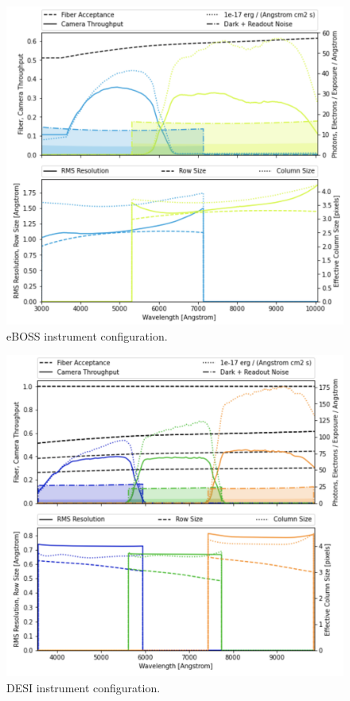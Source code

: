 \begin{figure}[h]
\centering
\includegraphics[width=12cm]{images/specsim/eboss_config.png}
\caption{eBOSS instrument configuration.}
\label{fig:eboss_config}
\end{figure}

\begin{figure}[h]
\centering
\includegraphics[width=12cm]{images/specsim/desi_config.png}
\caption{DESI instrument configuration.}
\label{fig:desi_config}
\end{figure}

